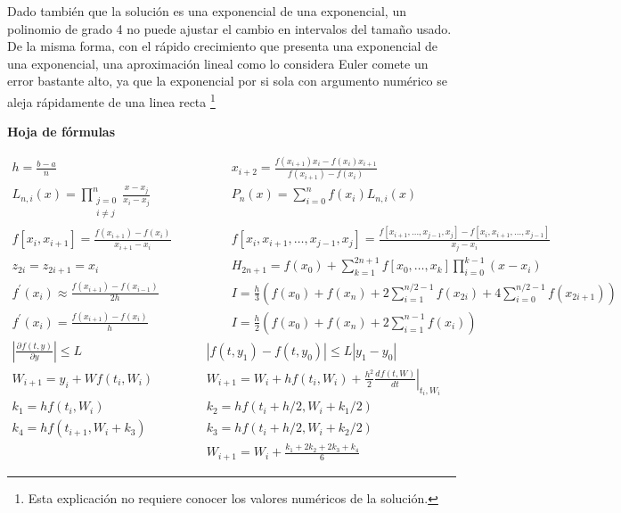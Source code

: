 \documentclass[12pt]{article}
\newcommand{\diff}[3]{\frac{d^{#3} #1}{d#2^{#3}}}
\newcommand{\pdiff}[3]{\frac{\partial^{#3} #1}{\partial#2^{#3}}}
\newcommand{\abs}[1]{\left| #1 \right|}
\begin{document}
\begin{enumerate}[leftmargin=*,widest=9]
\begin{enumerate}[label=\alph*]
   Dado también que la solución es una exponencial de una exponencial, un polinomio de grado 4 no puede ajustar el cambio en intervalos del tamaño usado. De la misma forma, con el rápido crecimiento que presenta una exponencial de una exponencial, una aproximación lineal como lo considera Euler comete un error bastante alto, ya que la exponencial por si sola con argumento numérico se aleja rápidamente de una linea recta \footnote{Esta explicación no requiere conocer los valores numéricos de la solución.}
    \end{enumerate}
  \end{enumerate}
\clearpage
\begin{center}
\textbf{Hoja de fórmulas}
\end{center}
{\large
\[
\begin{array}{cc}
h = \frac{b - a}{n} \qquad & \qquad
x_{i+2} = \frac{f(x_{i+1}){x_i}-f(x_{i}){x_{i+1}}}{f(x_{i+1}) - f(x_i)} \\
L_{n, i}(x) = \prod\limits_{\substack{j=0\\ i \neq j}}^n \frac{x - x_j}{x_i - x_j} \qquad & \qquad
P_n(x) = \sum\limits_{i = 0}^n f(x_i)L_{n,i}(x) \\
f\left[x_i, x_{i+1}\right] = \frac{f(x_{i+1})-f(x_i)}{x_{i+1}-x_i} \qquad & \qquad
f\left[ x_i, x_{i+1}, \ldots, x_{j-1}, x_j\right] = \frac{f\left[x_{i+1}, \ldots, x_{j-1}, x_j\right] - f\left[ x_i, x_{i+1}, \ldots, x_{j-1} \right]}{x_j - x_i} \\
z_{2i} = z_{2i+1} = x_i \qquad & \qquad
H_{2n+1} = f(x_0) + \sum\limits_{k=1}^{2n+1} f\left[x_0, \ldots, x_k\right] \prod\limits_{i = 0}^{k-1}(x-x_i)  \\
f^\prime(x_i) \approx \frac{f(x_{i+1}) - f(x_{i-1})}{2h} \qquad & \qquad
I = \frac{h}{3}\left( f(x_0) + f(x_n) + 2\sum\limits_{i=1}^{n/2-1}f(x_{2i}) + 4\sum\limits_{i=0}^{n/2-1}f(x_{2i+1}) \right) \\
f^\prime(x_i) = \frac{f(x_{i+1})-f(x_i)}{h} \qquad & \qquad
I = \frac{h}{2}\left( f(x_0) + f(x_n) + 2\sum\limits_{i = 1}^{n-1}f(x_i)\right) \\
\abs{\pdiff{f(t,y)}{y}{}} \leq L & \abs{f(t, y_1) -f(t, y_0)} \leq L\abs{y_1 - y_0}\\
W_{i+1} = y_i + W f(t_i,W_i) & W_{i+1} = W_i + h f(t_i,W_i) + \frac{h^2}{2} \left.\diff{f(t,W)}{t}{} \right|_{t_i, W_i} \\
k_1  =  h f(t_i,W_i) & k_2  =  h f(t_i+h/2,W_i + k_1/2) \\
k_4  =  h f(t_{i+1},W_i + k_3) & k_3  =  h f(t_i+h/2,W_i + k_2/2)\\
 & W_{i+1} = W_i + \frac{k_1+2k_2+2k_3+k_4}{6}
\end{array}
\]
}
\end{document}
